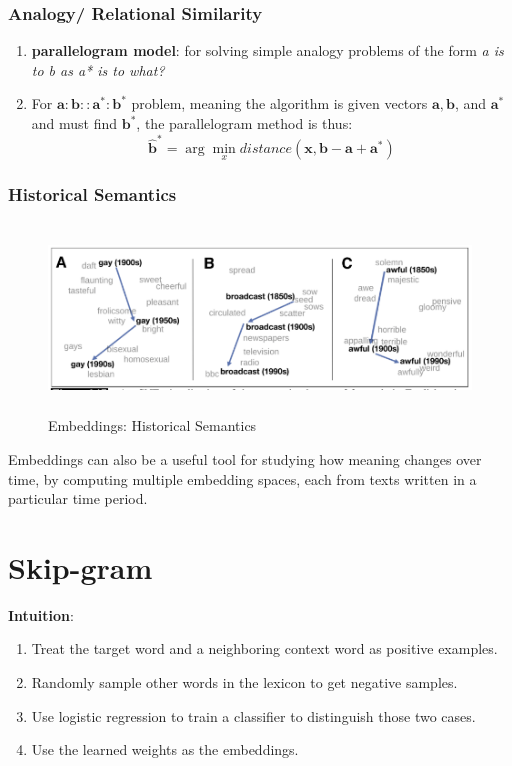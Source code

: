 \subsubsection{Analogy/ Relational Similarity \cite{nlp-1}}\label{Analogy/ Relational Similarity}
\begin{enumerate}
    \item \textbf{parallelogram model}: for solving simple analogy problems of the form \textit{a is to b as a* is to what?}

    \item For $\mathbf{a : b :: a^*: b^*}$ problem, meaning the algorithm is given vectors $\mathbf{a, b}$, and $\mathbf{a^*}$ and must find $\mathbf{b^*}$, the parallelogram method is thus:
    \[
        \hat{\mathbf{b}}^* = \arg\min_x distance(\mathbf{x,b-a+a^*})
    \]

    
\end{enumerate}

\subsubsection{Historical Semantics \cite{nlp-1}}\label{Embeddings: Historical Semantics}

\begin{figure}[h]
    \centering
    \includegraphics[width=0.6\linewidth, height=5cm, keepaspectratio]{Pictures/info-retrieval/embedding-historical-semantics.png}
    \caption{Embeddings: Historical Semantics}
\end{figure}

Embeddings can also be a useful tool for studying how meaning changes over time, by computing multiple embedding spaces, each from texts written in a particular time period.




\section{Skip-gram \cite{nlp-1}}\label{Skip-gram}
\textbf{Intuition}:
\begin{enumerate}
    \item Treat the target word and a neighboring context word as positive examples.
    \item Randomly sample other words in the lexicon to get negative samples.
    \item Use logistic regression to train a classifier to distinguish those two cases.
    \item Use the learned weights as the embeddings.
\end{enumerate}

